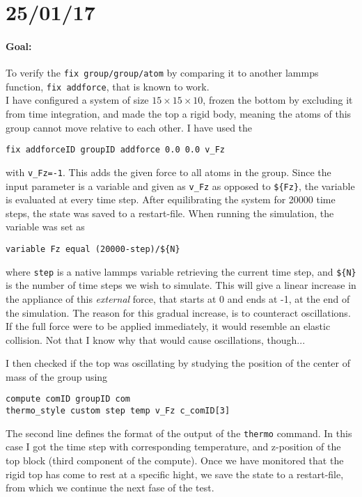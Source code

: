 \documentclass[twoside,english]{uiofysmaster}
\begin{document}
\section*{25/01/17}
\paragraph{Goal:} To verify the \texttt{fix group/group/atom} by comparing it to another lammps function, \texttt{fix addforce}, that is known to work.\\ 
 
 \noindent
I have configured a system of size $15\times15\times10$, frozen the bottom by excluding it from time integration, and made the top a rigid body, meaning the atoms of this group cannot move relative to each other. 
I have used the 
\begin{lstlisting}[language=lammpsInput]
fix addforceID groupID addforce 0.0 0.0 v_Fz
\end{lstlisting}
with \texttt{v\_Fz=-1}.
This adds the given force to all atoms in the group. Since the input parameter is a variable and given as \texttt{v\_Fz} as opposed to \texttt{\$\{Fz\}}, the variable is evaluated at every time step. 
After equilibrating the system for 20000 time steps, the state was saved to a restart-file. 
When running the simulation, the variable was set as
\begin{lstlisting}[language=lammpsInput]
variable Fz equal (20000-step)/${N}
\end{lstlisting}
where \texttt{step} is a native lammps variable retrieving the current time step, and \texttt{\$\{N\}} is the number of time steps we wish to simulate.
This will give a linear increase in the appliance of this {\it external} force, that starts at 0 and ends at -1, at the end of the simulation. The reason for this gradual increase, is to counteract oscillations. If the full force were to be applied immediately, it would resemble an elastic collision. Not that I know why that would cause oscillations, though...

I then checked if the top was oscillating by studying the position of the center of mass of the group using 
\begin{lstlisting}[language=lammpsInput]
compute comID groupID com
thermo_style custom step temp v_Fz c_comID[3]
\end{lstlisting}
The second line defines the format of the output of the \texttt{thermo} command. 
In this case I got the time step with corresponding temperature, and z-position of the top block (third component of the compute).
Once we have monitored that the rigid top has come to rest at a specific hight, we save the state to a restart-file, from which we continue the next fase of the test.
\end{document}
